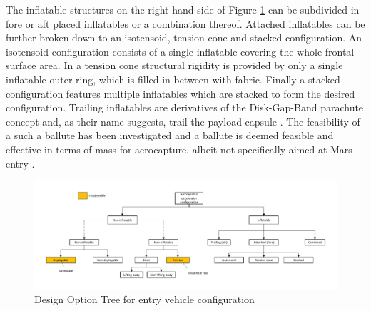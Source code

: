 The inflatable structures on the right hand side of Figure \ref{fig:dotconfig} can be subdivided in fore or aft placed inflatables or a combination thereof. Attached inflatables can be further broken down to an isotensoid, tension cone and stacked configuration. An isotensoid configuration consists of a single inflatable covering the whole frontal surface area. In a tension cone structural rigidity is provided by only a single inflatable outer ring, which is filled in between with fabric. Finally a stacked configuration features multiple inflatables which are stacked to form the desired configuration. \cite{Smith2011, Yamada2009, Hughes2005} Trailing inflatables are derivatives of the Disk-Gap-Band parachute concept and, as their name suggests, trail the payload capsule \cite{Smith2010}. The feasibility of a such a ballute has been investigated and a ballute is deemed feasible and effective in terms of mass for aerocapture, albeit not specifically aimed at Mars entry \cite{Rohrschneider2007, Miller2003}.

\begin{figure}[H]
\hspace{-23mm}
\includegraphics[width = 1.25\textwidth]{Figure/DOT_configuration.pdf}
\vspace{-5mm}
\caption{Design Option Tree for entry vehicle configuration}
\label{fig:dotconfig}
\end{figure}

